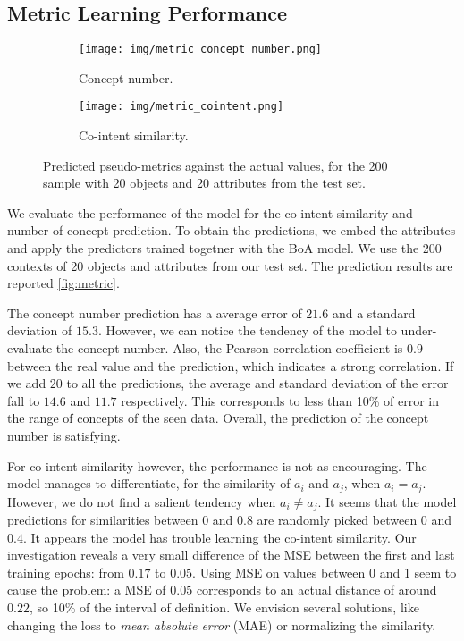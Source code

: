 \subsection{Metric Learning Performance}
\begin{figure}[t]
\begin{subfigure}{.48\textwidth}\centering
    \texttt{[image: img/metric\_concept\_number.png]}  
    \caption{Concept number.}\label{fig:metric_concept}
\end{subfigure}
\begin{subfigure}{.48\textwidth}\centering
    \texttt{[image: img/metric\_cointent.png]}  
    \caption{Co-intent similarity.}\label{fig:metric_cointent}
\end{subfigure}
\caption{Predicted pseudo-metrics against the actual values, for the 200 sample with 20 objects and 20 attributes from the test set.}\label{fig:metric}
\end{figure}

We evaluate the performance of the model for the co-intent similarity and number of concept prediction.
To obtain the predictions, we embed the attributes and apply the predictors trained togetner with the BoA model.
We use the 200 contexts of 20 objects and attributes from our test set.
The prediction results are reported \autoref{fig:metric}.


The concept number prediction has a average error of $21.6$ and a standard deviation of $15.3$.
However, we can notice the tendency of the model to under-evaluate the concept number.
Also, the Pearson correlation coefficient is $0.9$ between the real value and the prediction, which indicates a strong correlation.
If we add $20$ to all the predictions, the average and standard deviation of the error fall to $14.6$ and $11.7$ respectively.
This corresponds to less than 10\% of error in the range of concepts of the seen data.
Overall, the prediction of the concept number is satisfying.

For co-intent similarity however, the performance is not as encouraging.
The model manages to differentiate, for the similarity of $a_i$ and $a_j$, when $a_i = a_j$.
However, we do not find a salient tendency when $a_i \neq a_j$.
It seems that the model predictions for similarities between $0$ and $0.8$ are randomly picked between $0$ and $0.4$.
It appears the model has trouble learning the co-intent similarity.
Our investigation reveals a very small difference of the MSE between the first and last training epochs: from $0.17$ to $0.05$.
Using MSE on values between 0 and 1 seem to cause the problem: a MSE of $0.05$ corresponds to an actual distance of around $0.22$, so 10\% of the interval of definition.
We envision several solutions, like changing the loss to \textit{mean absolute error} (MAE) or normalizing the similarity.


